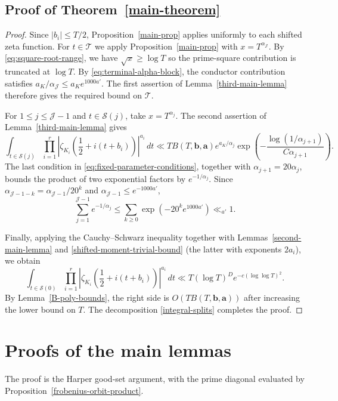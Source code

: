 \documentclass[twoside,reqno,11pt,a4paper]{amsart}
\numberwithin{equation}{section}
\theoremstyle{plain}
\theoremstyle{definition}
\theoremstyle{remark}
\renewcommand{\le}{\leqslant}
\renewcommand{\ge}{\geqslant}
\begin{document}
		\subsection{Proof of Theorem~\ref{main-theorem}}
\begin{proof}
Since $|b_i|\le T/2$, Proposition~\ref{main-prop} applies uniformly to each shifted zeta function. For $t\in \mathcal{T}$ we apply Proposition~\ref{main-prop} with $x=T^{\alpha_{\mathcal J}}$.  By \eqref{eq:square-root-range}, we have $\sqrt{x}\ge \log T$ so the prime-square contribution is truncated at $\log T$. By \eqref{eq:terminal-alpha-block},
the conductor contribution satisfies $a_K/\alpha_{\mathcal J}\le a_Ke^{1000a'}$.  The first assertion of
Lemma~\ref{third-main-lemma} therefore gives the required bound on
$\mathcal T$.

For $1\le j \le \mathcal{J}-1$ and $t\in \mathcal S(j)$, take $x=T^{\alpha_j}$.  The second
assertion of Lemma~\ref{third-main-lemma} gives
\begin{equation*}
 \int_{t\in \mathcal S(j)}\prod_{i=1}^r
 \left|\zeta_{K_i}\left(\frac12+i(t+b_i)\right)\right|^{a_i}\,dt
 \ll TB(T,\mathbf b,\mathbf a)e^{a_K/\alpha_j}
 \exp\left(-\frac{\log(1/\alpha_{j+1})}{C\alpha_{j+1}}\right).
\end{equation*}
The last condition in \eqref{eq:fixed-parameter-conditions}, together with
$\alpha_{j+1}=20\alpha_j$, bounds the product of two exponential factors by
$e^{-1/\alpha_j}$.  Since $\alpha_{\mathcal J-1-k}
=\alpha_{\mathcal J-1}/20^k$ and $\alpha_{\mathcal J-1}\le e^{-1000a'}$,
\begin{equation*}
\sum_{j=1}^{\mathcal J-1}e^{-1/\alpha_j}
\le\sum_{k\ge0}\exp(-20^ke^{1000a'})\ll_{a'}1.
\end{equation*}

Finally, applying the Cauchy--Schwarz inequality together with Lemmas~\ref{second-main-lemma} and \ref{shifted-moment-trivial-bound} (the latter with exponents $2a_i$), we obtain
\begin{equation*}
 \int_{t\in \mathcal S(0)}\prod_{i=1}^r
 \left|\zeta_{K_i}\left(\frac12+i(t+b_i)\right)\right|^{a_i}\,dt
 \ll T(\log T)^D e^{-c(\log\log T)^2}.
\end{equation*}
By Lemma~\ref{B-poly-bounds}, the right side is
$O(TB(T,\mathbf b,\mathbf a))$ after increasing the lower bound on $T$.
The decomposition \eqref{integral-splits} completes the proof.
\end{proof}
		\section{Proofs of the main lemmas}
    The proof is the Harper good-set argument, with the prime diagonal evaluated by Proposition~\ref{frobenius-orbit-product}.
	
\end{document}
